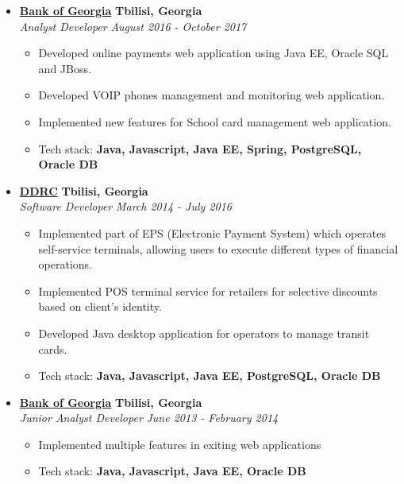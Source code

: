 \documentclass[10pt,letterpaper]{article}
\begin{document}
\begin{itemize}
    \item[]
    {\href{http://bankofgeorgia.ge/en/}{\textbf{Bank of Georgia}} \hfill
      \textbf{Tbilisi, Georgia}}
    \\
    {\emph{Analyst Developer} \hfill \emph{August 2016 - October 2017}}

    \begin{itemize}[label=\textbullet]
      \itemsep0em
      \item Developed online payments web application using Java EE, Oracle SQL and JBoss.
      \item Developed VOIP phones management and monitoring web application.
      \item Implemented new features for School card management web application.
      \item {Tech stack: \textbf{Java, Javascript, Java EE, Spring, PostgreSQL, Oracle DB}}
      
    \end{itemize}
    \hfill \break

    \item[]
    {\href{https://www.linkedin.com/company/ddrc-didi-digomi-research-center}{\textbf{DDRC}}
\hfill
      \textbf{Tbilisi, Georgia}}
    \\
    {\emph{Software Developer} \hfill \emph{March 2014 - July 2016}}

    \begin{itemize}[label=\textbullet]
      \itemsep0em
      \item Implemented part of EPS (Electronic Payment System) which operates self-service terminals,
allowing users to execute different types of financial operations.
      \item Implemented POS terminal service for retailers for selective discounts based on client's identity.
      \item Developed Java desktop application for operators to manage transit cards.
      \item {Tech stack: \textbf{Java, Javascript, Java EE, PostgreSQL, Oracle DB}}
      
    \end{itemize}
    \hfill \break
    
     \item[]
    {\href{http://bankofgeorgia.ge/en/}{\textbf{Bank of Georgia}} \hfill
      \textbf{Tbilisi, Georgia}}
    \\
    {\emph{Junior Analyst Developer} \hfill \emph{June 2013 - February 2014}}

    \begin{itemize}[label=\textbullet]
      \itemsep0em
      \item Implemented multiple features in exiting web applications
      \item {Tech stack: \textbf{Java, Javascript, Java EE, Oracle DB}}
    \end{itemize}
    
    \end{itemize}
\end{document}
